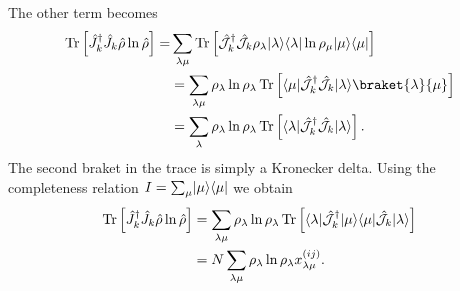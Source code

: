 The other term becomes
\begin{equation}
    \begin{split}
        \Tr\left[\hat J_{k}^\dagger \hat J_{k}\hat\rho\ln\hat\rho\right]=& \sum_{\lambda\mu}\Tr\left[\hat{\mathcal{J}}_{k}^\dagger \hat{\mathcal{J}}_{k}\rho_\lambda\ket{\lambda}\bra{\lambda}\ln\rho_\mu\ket{\mu}\bra{\mu}\right]\\
        & = \sum_{\lambda\mu}\rho_\lambda\ln\rho_\lambda\Tr\left[\bra{\mu}\hat{\mathcal{J}}_{k}^\dagger\hat{\mathcal{J}}_{k}\ket{\lambda}\braket{\lambda}{\mu}\right]\\
        &= \sum_{\lambda}\rho_\lambda\ln\rho_\lambda\Tr\left[\bra{\lambda}\hat{\mathcal{J}}_{k}^\dagger\hat{\mathcal{J}}_{k}\ket{\lambda}\right].\\
    \end{split}
\end{equation}
The second braket in the trace is simply a Kronecker delta. Using the completeness relation $I = \sum_\mu\lvert\mu\rangle\langle\mu\rvert$ we obtain
\begin{equation}
    \begin{split}
        \operatorname{Tr}\left[\hat J_{k}^\dagger \hat J_{k}\hat\rho\ln\hat\rho\right]&= \sum_{\lambda\mu}\rho_\lambda\ln\rho_\lambda\operatorname{Tr}\left[\langle\lambda\rvert\hat{\mathcal{J}}_{k}^\dagger\lvert\mu\rangle\langle\mu\rvert\hat{\mathcal{J}}_{k}\lvert\lambda\rangle\right]\\
        &= N\sum_{\lambda\mu}\rho_\lambda\ln\rho_\lambda x^{(ij)}_{\lambda\mu}.\\
    \end{split}
\end{equation}

